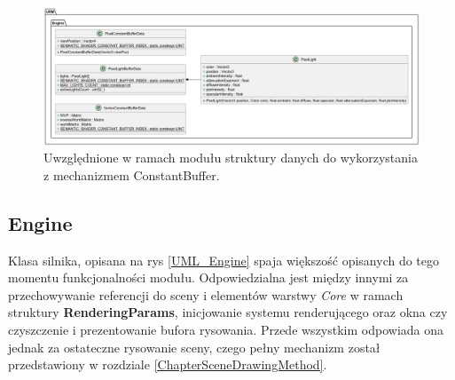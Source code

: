 	\begin{figure}[h!]
		\centering
		\includegraphics[width=\textwidth]{images/UML/constantbuffers.png}
		\caption{Uwzględnione w ramach modułu struktury danych do wykorzystania z mechanizmem ConstantBuffer.}
		\label{UML_StandardConstantBuffers}
	\end{figure}
	
\subsection{Engine}
	Klasa silnika, opisana na rys \ref{UML_Engine} spaja większość opisanych do tego momentu funkcjonalności modułu. Odpowiedzialna jest między innymi za przechowywanie referencji do sceny i elementów warstwy \textit{Core} w ramach struktury \textbf{RenderingParams}, inicjowanie systemu renderującego oraz okna czy czyszczenie i prezentowanie bufora rysowania. Przede wszystkim odpowiada ona jednak za ostateczne rysowanie sceny, czego pełny mechanizm został przedstawiony w rozdziale \ref{ChapterSceneDrawingMethod}. 
	
